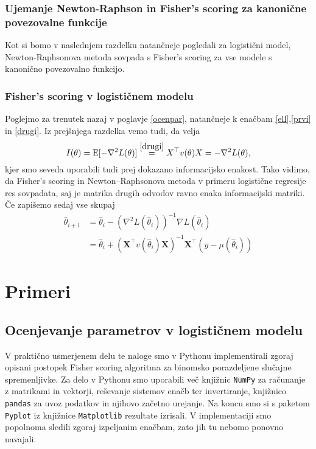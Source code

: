 \documentclass[12pt,a4paper]{amsart}
\theoremstyle{definition} %
\theoremstyle{plain} %
\begin{document}
\subsubsection{Ujemanje Newton-Raphson in Fisher's scoring za kanonične povezovalne funkcije}
Kot si bomo v naslednjem razdelku natančneje pogledali za logistični model, Newton-Raphsonova metoda sovpada s Fisher's scoring za vse modele s kanonično povezovalno funkcijo.



\subsubsection{Fisher's scoring v logističnem modelu}
Poglejmo za trenutek nazaj v poglavje \ref{ocenpar}, natančneje k enačbam \eqref{ell},\eqref{prvi} in \eqref{drugi}. Iz prejšnjega razdelka vemo tudi, da velja
\[
    I(\theta) = \mathrm{E}[-\nabla ^2 L(\theta)] \overset{\eqref{drugi}}{=} X^\top v(\theta)X = -\nabla ^2 L(\theta),
\]
kjer smo seveda uporabili tudi prej dokazano informacijsko enakost. Tako vidimo, da Fisher's scoring in Newton--Raphsonova metoda v primeru logistične regresije
res sovpadata, saj je matrika drugih odvodov ravno enaka informacijski matriki. Če zapišemo sedaj vse skupaj
\begin{align}
    \hat{\theta}_{i+1} &= \hat{\theta}_{i} - (\nabla^{2} L(\hat{\theta}_{i}))^{-1} \nabla L(\hat{\theta}_{i}) \nonumber \\
    &= \hat{\theta}_{i} + (\mathbf{X}^\top v(\hat{\theta}_{i}) \mathbf{X})^{-1}\mathbf{X}^\top(y - \mu(\hat{\theta}_{i})) 
\end{align}
\section{Primeri}
\subsection{Ocenjevanje parametrov v logističnem modelu}

V praktično usmerjenem delu te naloge smo v Pythonu implementirali zgoraj opisani postopek Fisher scoring algoritma za binomsko porazdeljene slučajne
spremenljivke. Za delo v Pythonu smo uporabili več knjižnic\; \texttt{NumPy} za računanje z matrikami in vektorji, reševanje sistemov enačb ter invertiranje,
knjižnico \texttt{pandas} za uvoz podatkov in njihovo začetno urejanje. Na koncu smo si s paketom \texttt{Pyplot} iz knjižnice \texttt{Matplotlib} rezultate izrisali.
V implementaciji smo popolnoma sledili zgoraj izpeljanim enačbam, zato jih tu nebomo ponovno navajali.
\end{document}

